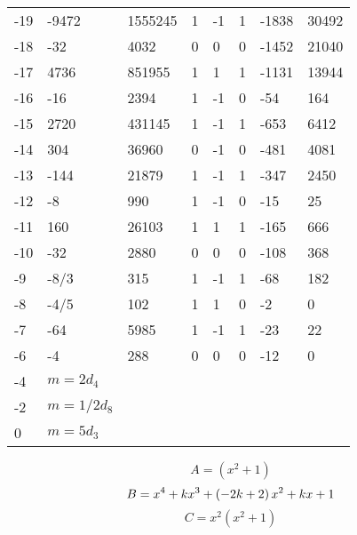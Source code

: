 \documentclass{amsart}
\begin{document}
\begin{longtable}{|l|l|l|lllll|}
-19&-9472&1555245&1&-1&1&-1838&30492\\
-18&-32&4032&0&0&0&-1452&21040\\
-17&4736&851955&1&1&1&-1131&13944\\
-16&-16&2394&1&-1&0&-54&164\\
-15&2720&431145&1&-1&1&-653&6412\\
-14&304&36960&0&-1&0&-481&4081\\
-13&-144&21879&1&-1&1&-347&2450\\
-12&-8&990&1&-1&0&-15&25\\
-11&160&26103&1&1&1&-165&666\\
-10&-32&2880&0&0&0&-108&368\\
-9&-8/3&315&1&-1&1&-68&182\\
-8&-4/5&102&1&1&0&-2&0\\
-7&-64&5985&1&-1&1&-23&22\\
-6&-4&288&0&0&0&-12&0\\
-4&$m=2d_{4}$&&\multicolumn{5}{c|}{}\\
-2&$m=1/2d_{8}$&&\multicolumn{5}{c|}{}\\
0&$m=5d_{3}$&&\multicolumn{5}{c|}{}\\
\hline
\end{longtable}
$$A=(x^2
 + 1)$$
$$B=x^4
 + k\*x^3
 + \left(-2\*k
 + 2\right) \*x^2
 + k\*x
 + 1$$
$$C=x^2(x^2
 + 1)$$
\end{document}
